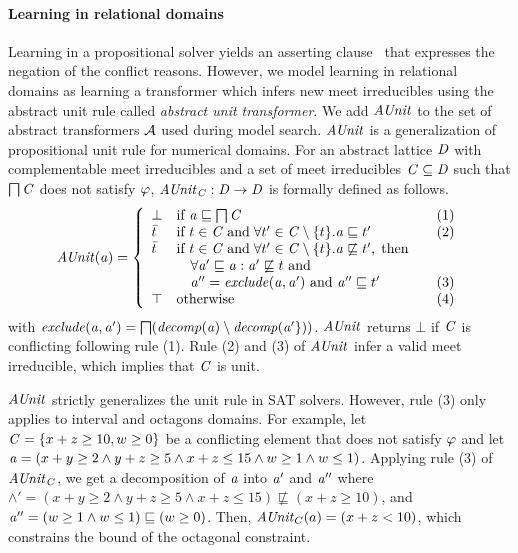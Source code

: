 \paragraph{\textbf{Learning in relational domains}}
Learning in a propositional solver yields an asserting
clause~\cite{cdcl} that expresses the negation of the conflict
reasons.  However, we model learning in relational domains as learning
a transformer which infers new meet irreducibles using the abstract
unit rule called {\em abstract unit transformer}.  We add $\mathit{AUnit}$ to
the set of abstract transformers $\mathcal{A}$ used during model
search. $\mathit{AUnit}$ is a generalization of propositional unit rule for
numerical domains.  For an abstract lattice $\mathit{D}$ with
complementable meet irreducibles and a set of meet irreducibles $\mathit{C}
\subseteq \mathit{D}$ such that $\bigsqcap
\mathit{C}$ does not satisfy $\varphi$, $\mathit{AUnit}_{\mathit{C}}: \mathit{D} \rightarrow
\mathit{D}$ is formally defined as follows.
\[ \aunit(\absval) =
 \left\{\begin{array}{l@{\quad}l@{\qquad}l}
  \bot       & \text{if } \absval \sqsubseteq \bigsqcap \conflictset & (1)\\
  \bar{t}    & \text{if } t \in \conflictset \; \text{and} \; \forall t' \in \conflictset
  \setminus \{t\}. \absval  \sqsubseteq t' & (2) \\
  \bar{t}    & \text{if } t \in \conflictset \; \text{and} \; \forall t' \in \conflictset \setminus \{t\}. \absval
  \not\sqsubseteq t', \; \text{then} \\ 
             & \quad \forall \absval' \sqsubseteq \absval: \absval'
             \not\sqsubseteq t \text{ and} \\ 
             & \quad \absval''=\exclude(\absval,\absval') \text{ and
             }\absval''\sqsubseteq t' & (3) \\
  \top & \text{otherwise} & (4) \\
 \end{array}\right.
\]
with $\mathit{exclude}(\mathit{a},\mathit{a}')=\bigsqcap({\mathit{decomp}}(\mathit{a}) \setminus
{\mathit{decomp}}(\mathit{a}'\}))$.  $\mathit{AUnit}$ returns $\bot$ if $\mathit{C}$ is
conflicting following rule (1).  Rule (2) and (3) of $\mathit{AUnit}$ infer a
valid meet irreducible, which implies that $\mathit{C}$ is unit.

$\mathit{AUnit}$ strictly generalizes the unit rule in SAT solvers.  
However, rule (3) only applies to interval and octagons domains.  
For example, let $\mathit{C} = \{ x+z \geq 10, w \geq 0 \}$ be a conflicting element 
that does not satisfy $\varphi$ and let $\mathit{a}= (x+y
\geq 2\wedge y+z \geq 5\wedge x+z \leq 15\wedge w \geq 1\wedge w \leq
1)$.  Applying rule (3) of $\mathit{AUnit}_{\mathit{C}}$, we get a
decomposition of $\mathit{a}$ into $\mathit{a}'$ and $\mathit{a}''$ where
$\wedge'= (x+y \geq 2\wedge y+z \geq 5\wedge x+z \leq 15)
\not\sqsubseteq (x+z \geq 10)$, and $\mathit{a}''= (w \geq 1\wedge w \leq
1) \sqsubseteq (w \geq 0)$.  Then, $\mathit{AUnit}_C(a) = (x+z < 10)$, which
constrains the bound of the octagonal constraint.

